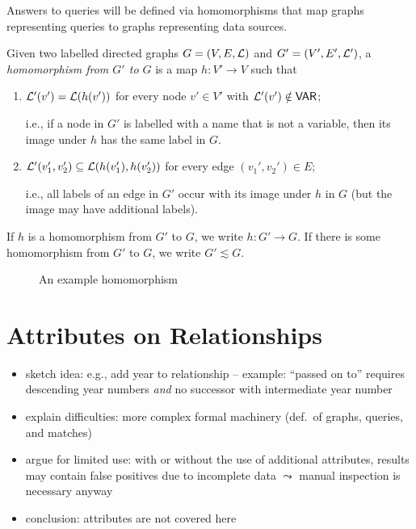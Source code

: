 Answers to queries will be defined via homomorphisms that map graphs representing queries
to graphs representing data sources.
%
\begin{definition}
  Given two labelled directed graphs $G = (V,E,\mathcal{L})$ and $G' = (V',E',\mathcal{L}')$,
  a \emph{homomorphism from $G'$ to $G$} is a map $h : V' \to V$ such that
  \begin{enumerate}
    \item
      $\mathcal{L}'(v') = \mathcal{L}(h(v'))$ for every node $v' \in V'$ with $\mathcal{L}'(v') \notin \mathsf{VAR}$;
      
      i.e., if a node in $G'$ is labelled with a name that is not a variable,
      then its image under $h$ has the same label in $G$.
    \item
      $\mathcal{L}'(v_1', v_2') \subseteq \mathcal{L}(h(v_1'), h(v_2'))$
      for every edge $(v_1',v_2') \in E$;
      
      i.e., all labels of an edge in $G'$ occur with its image under $h$ in $G$
      (but the image may have additional labels).
  \end{enumerate}
  If $h$ is a homomorphism from $G'$ to $G$, we write $h : G' \to G$.
  If there is some homomorphism from $G'$ to $G$, we write $G' \lesssim G$.
\end{definition}

\begin{figure}
  \caption{An example homomorphism}
  \label{fig:example_hmph}
\end{figure}



\section{Attributes on Relationships}


\begin{itemize}
  \item
    sketch idea: e.g., add year to relationship  -- example: ``passed on to'' requires descending year numbers \emph{and} no successor with intermediate year number
  \item
    explain difficulties: more complex formal machinery (def.\ of graphs, queries, and matches)
  \item
    argue for limited use: with or without the use of additional attributes, results may contain false positives due to incomplete data $\leadsto$ manual inspection is necessary anyway
  \item
    conclusion: attributes are not covered here
\end{itemize}



